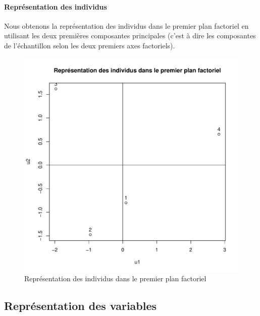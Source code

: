\documentclass{report}
\begin{document}
\paragraph{Représentation des individus}
Nous obtenons la représentation des
individus dans le premier plan factoriel en utilisant les deux premières
composantes principales (c'est à dire les composantes de l'échantillon selon les
deux premiers axes factoriels).
\begin{figure}[h!]
\begin{center}
    \includegraphics[width=\textwidth]{acpq3ok.pdf}
    \caption{Représentation des individus dans le premier plan factoriel}
\end{center}
\end{figure}
\subsection{Représentation des variables}
\end{document}
